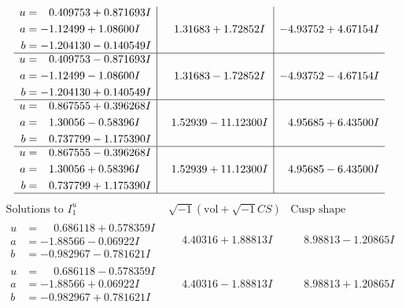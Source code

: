 \documentclass[1p]{elsarticle_modified}
\theoremstyle{definition}
\newcommand{\I}{\sqrt{-1}}
\begin{document}
$$\begin{array}{c|c|c}
\begin{aligned}
u &= \phantom{-}0.409753 + 0.871693 I \\
a &= -1.12499 + 1.08600 I \\
b &= -1.204130 - 0.140549 I\end{aligned}
 & \phantom{-}1.31683 + 1.72852 I & -4.93752 + 4.67154 I \\ \hline\begin{aligned}
u &= \phantom{-}0.409753 - 0.871693 I \\
a &= -1.12499 - 1.08600 I \\
b &= -1.204130 + 0.140549 I\end{aligned}
 & \phantom{-}1.31683 - 1.72852 I & -4.93752 - 4.67154 I \\ \hline\begin{aligned}
u &= \phantom{-}0.867555 + 0.396268 I \\
a &= \phantom{-}1.30056 - 0.58396 I \\
b &= \phantom{-}0.737799 - 1.175390 I\end{aligned}
 & \phantom{-}1.52939 - 11.12300 I & \phantom{-}4.95685 + 6.43500 I \\ \hline\begin{aligned}
u &= \phantom{-}0.867555 - 0.396268 I \\
a &= \phantom{-}1.30056 + 0.58396 I \\
b &= \phantom{-}0.737799 + 1.175390 I\end{aligned}
 & \phantom{-}1.52939 + 11.12300 I & \phantom{-}4.95685 - 6.43500 I\\
 \hline 
 \end{array}$$\newpage$$\begin{array}{c|c|c}  
\text{Solutions to }I^u_{1}& \I (\text{vol} + \sqrt{-1}CS) & \text{Cusp shape}\\
 \hline 
\begin{aligned}
u &= \phantom{-}0.686118 + 0.578359 I \\
a &= -1.88566 - 0.06922 I \\
b &= -0.982967 - 0.781621 I\end{aligned}
 & \phantom{-}4.40316 + 1.88813 I & \phantom{-}8.98813 - 1.20865 I \\ \hline\begin{aligned}
u &= \phantom{-}0.686118 - 0.578359 I \\
a &= -1.88566 + 0.06922 I \\
b &= -0.982967 + 0.781621 I\end{aligned}
 & \phantom{-}4.40316 - 1.88813 I & \phantom{-}8.98813 + 1.20865 I \\ \hline\begin{aligned}

\end{aligned}
\end{array}$$
\end{document}
